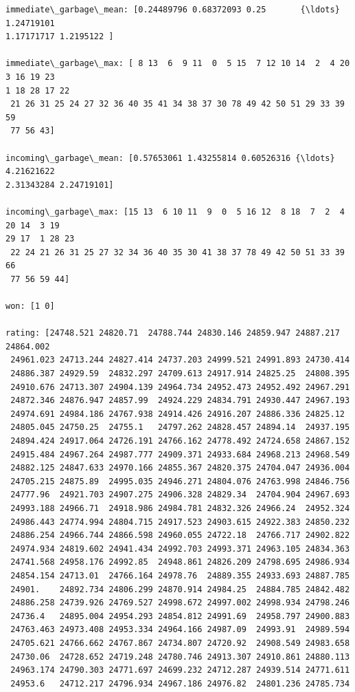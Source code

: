 \documentclass[11pt]{article}
\begin{document}
\begin{Verbatim}[commandchars=\\\{\}]
immediate\_garbage\_mean: [0.24489796 0.68372093 0.25       {\ldots} 1.24719101
1.17171717 1.2195122 ]

immediate\_garbage\_max: [ 8 13  6  9 11  0  5 15  7 12 10 14  2  4 20  3 16 19 23
1 18 28 17 22
 21 26 31 25 24 27 32 36 40 35 41 34 38 37 30 78 49 42 50 51 29 33 39 59
 77 56 43]

incoming\_garbage\_mean: [0.57653061 1.43255814 0.60526316 {\ldots} 4.21621622
2.31343284 2.24719101]

incoming\_garbage\_max: [15 13  6 10 11  9  0  5 16 12  8 18  7  2  4 20 14  3 19
29 17  1 28 23
 22 24 21 26 31 25 27 32 34 36 40 35 30 41 38 37 78 49 42 50 51 33 39 66
 77 56 59 44]

won: [1 0]

rating: [24748.521 24820.71  24788.744 24830.146 24859.947 24887.217 24864.002
 24961.023 24713.244 24827.414 24737.203 24999.521 24991.893 24730.414
 24886.387 24929.59  24832.297 24709.613 24917.914 24825.25  24808.395
 24910.676 24713.307 24904.139 24964.734 24952.473 24952.492 24967.291
 24872.346 24876.947 24857.99  24924.229 24834.791 24930.447 24967.193
 24974.691 24984.186 24767.938 24914.426 24916.207 24886.336 24825.12
 24805.045 24750.25  24755.1   24797.262 24828.457 24894.14  24937.195
 24894.424 24917.064 24726.191 24766.162 24778.492 24724.658 24867.152
 24915.484 24967.264 24987.777 24909.371 24933.684 24968.213 24968.549
 24882.125 24847.633 24970.166 24855.367 24820.375 24704.047 24936.004
 24705.215 24875.89  24995.035 24946.271 24804.076 24763.998 24846.756
 24777.96  24921.703 24907.275 24906.328 24829.34  24704.904 24967.693
 24993.188 24966.71  24918.986 24984.781 24832.326 24966.24  24952.324
 24986.443 24774.994 24804.715 24917.523 24903.615 24922.383 24850.232
 24886.254 24966.744 24866.598 24960.055 24722.18  24766.717 24902.822
 24974.934 24819.602 24941.434 24992.703 24993.371 24963.105 24834.363
 24741.568 24958.176 24992.85  24948.861 24826.209 24798.695 24986.934
 24854.154 24713.01  24766.164 24978.76  24889.355 24933.693 24887.785
 24901.    24892.734 24806.299 24870.914 24984.25  24884.785 24842.482
 24886.258 24739.926 24769.527 24998.672 24997.002 24998.934 24798.246
 24736.4   24895.004 24954.293 24854.812 24991.69  24958.797 24900.883
 24763.463 24973.408 24953.334 24964.166 24987.09  24993.91  24989.594
 24705.621 24766.662 24767.867 24734.807 24720.92  24908.549 24983.658
 24730.06  24728.652 24719.248 24780.746 24913.307 24910.861 24880.113
 24963.174 24790.303 24771.697 24699.232 24712.287 24939.514 24771.611
 24953.6   24712.217 24796.934 24967.186 24976.82  24801.236 24785.734

\end{Verbatim}
\end{document}
